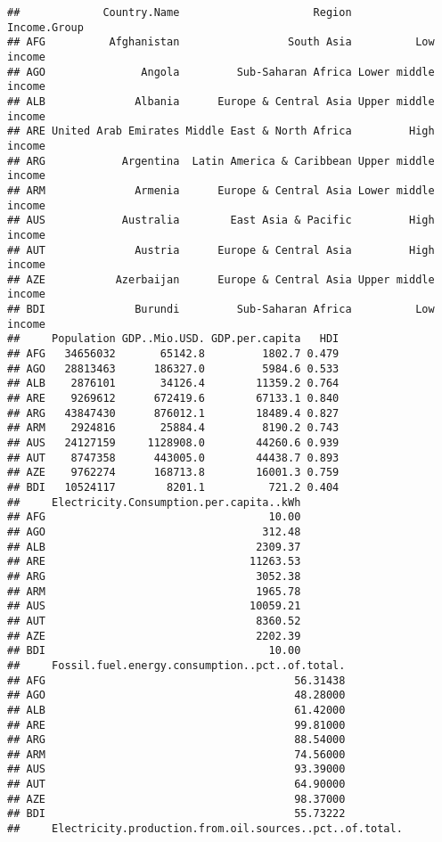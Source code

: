 \documentclass[]{article}
\begin{document}
\begin{verbatim}
##             Country.Name                     Region        Income.Group
## AFG          Afghanistan                 South Asia          Low income
## AGO               Angola         Sub-Saharan Africa Lower middle income
## ALB              Albania      Europe & Central Asia Upper middle income
## ARE United Arab Emirates Middle East & North Africa         High income
## ARG            Argentina  Latin America & Caribbean Upper middle income
## ARM              Armenia      Europe & Central Asia Lower middle income
## AUS            Australia        East Asia & Pacific         High income
## AUT              Austria      Europe & Central Asia         High income
## AZE           Azerbaijan      Europe & Central Asia Upper middle income
## BDI              Burundi         Sub-Saharan Africa          Low income
##     Population GDP..Mio.USD. GDP.per.capita   HDI
## AFG   34656032       65142.8         1802.7 0.479
## AGO   28813463      186327.0         5984.6 0.533
## ALB    2876101       34126.4        11359.2 0.764
## ARE    9269612      672419.6        67133.1 0.840
## ARG   43847430      876012.1        18489.4 0.827
## ARM    2924816       25884.4         8190.2 0.743
## AUS   24127159     1128908.0        44260.6 0.939
## AUT    8747358      443005.0        44438.7 0.893
## AZE    9762274      168713.8        16001.3 0.759
## BDI   10524117        8201.1          721.2 0.404
##     Electricity.Consumption.per.capita..kWh
## AFG                                   10.00
## AGO                                  312.48
## ALB                                 2309.37
## ARE                                11263.53
## ARG                                 3052.38
## ARM                                 1965.78
## AUS                                10059.21
## AUT                                 8360.52
## AZE                                 2202.39
## BDI                                   10.00
##     Fossil.fuel.energy.consumption..pct..of.total.
## AFG                                       56.31438
## AGO                                       48.28000
## ALB                                       61.42000
## ARE                                       99.81000
## ARG                                       88.54000
## ARM                                       74.56000
## AUS                                       93.39000
## AUT                                       64.90000
## AZE                                       98.37000
## BDI                                       55.73222
##     Electricity.production.from.oil.sources..pct..of.total.

\end{verbatim}
\end{document}
